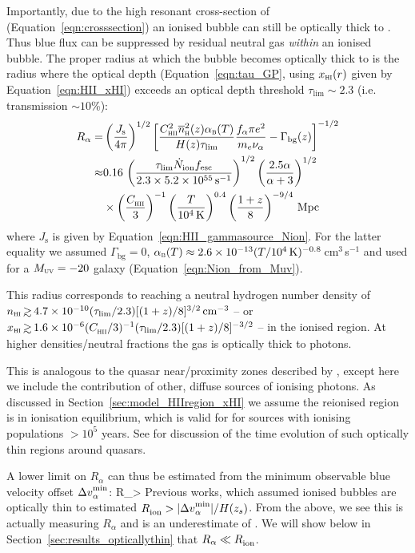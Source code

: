 \documentclass[fleqn,usenatbib]{mnras}
\begin{document}
Importantly, due to the high resonant cross-section of \lya (Equation~\eqref{eqn:crosssection}) an ionised bubble can still be optically thick to \lya. Thus blue \lya flux can be suppressed by residual neutral gas \textit{within} an ionised bubble. The proper radius at which the bubble becomes optically thick to \lya is the radius where the \citet{Gunn1965} optical depth (Equation~\eqref{eqn:tau_GP}, using $\xHI(r)$ given by Equation~\ref{eqn:HII_xHI}) exceeds an optical depth threshold $\tau_\mathrm{lim}\sim 2.3$ (i.e. transmission $\sim10$\%):
%
\begin{align} \label{eqn:opticallythin}
%
R_\alpha =& \left(\frac{J_\mathrm{s}}{4\pi}\right)^{1/2} \left[ \frac{ \clump[2] \nh[2](z) \alpha_\textsc{b}(T)}{H(z) \tau_\mathrm{lim}}\frac{f_\alpha \pi e^2}{m_e \nu_\alpha} - \Gamma_\textrm{bg}(z) \right]^{-1/2} \\
%
\approx& 0.16 \, \left(\frac{\tau_\mathrm{lim}\Nion\fesc}{2.3 \times 5.2 \times 10^{55}\,\mathrm{s}^{-1}}\right)^{1/2}  \left(\frac{2.5\alpha}{\alpha+3}\right)^{1/2} \nonumber \\
&\times \left(\frac{\clump}{3}\right)^{-1}   \left(\frac{T}{10^4\,\mathrm{K}}\right)^{0.4} \left(\frac{1+z}{8}\right)^{-9/4} \,\mathrm{Mpc} \nonumber
%
\end{align}
%
where $J_\mathrm{s}$ is given by Equation~\eqref{eqn:HII_gammasource_Nion}.
For the latter equality we assumed $\Gamma_\mathrm{bg} = 0$, $\alpha_\textsc{b}(T) \approx 2.6\times10^{-13}(T/10^4\,\mathrm{K})^{-0.8}$\,cm$^3$\,s$^{-1}$ and used \Nion for a $\MUV = -20$ galaxy (Equation~\ref{eqn:Nion_from_Muv}).

This radius corresponds to reaching a neutral hydrogen number density of $n_\HI \simgt 4.7\times10^{-10} (\tau_\mathrm{lim}/2.3)[(1+z)/8]^{3/2}\cm^{-3}$ -- or $\xHI \simgt 1.6\times10^{-6} (\clump/3)^{-1} (\tau_\mathrm{lim}/2.3)[(1+z)/8]^{-3/2}$ -- in the ionised region. At higher densities/neutral fractions the gas is optically thick to \lya photons.

This is analogous to the quasar near/proximity zones described by \citet{bolton2007c}, except here we include the contribution of other, diffuse sources of ionising photons. As discussed in Section~\ref{sec:model_HIIregion_xHI} we assume the reionised region is in ionisation equilibrium, which is valid for for sources with ionising populations $>10^5$ years. See \citet{Davies2019} for discussion of the time evolution of such optically thin regions around quasars.

A lower limit on $R_\alpha$ can thus be estimated from the minimum observable blue \lya velocity offset $\DV^\mathrm{min}_\alpha$:
%
\BE \label{eqn:opticallythin_DV}
R_\alpha > 
\EE
%
Previous works, which assumed ionised bubbles are optically thin to \lya \citep[e.g.,][]{Matthee2018b,Hashimoto2018a} estimated $\Rion > |\DV^\mathrm{min}_\alpha|/H(z_s)$. From the above, we see this is actually measuring $R_\alpha$ and is an underestimate of \Rion. We will show below in Section~\ref{sec:results_opticallythin} that $R_\alpha \ll \Rion$. 
\end{document}
